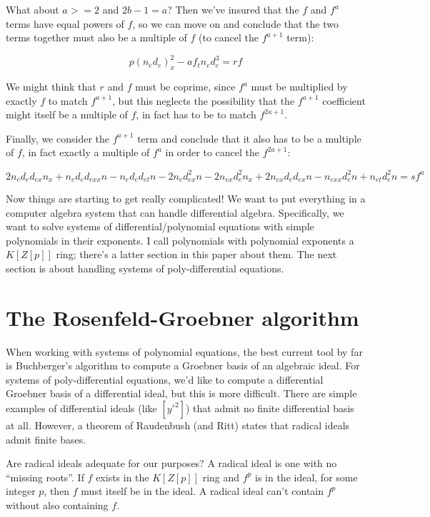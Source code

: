 \documentclass{article}
\begin{document}
What about $a>=2$ and $2b-1=a$?  Then we've insured that the
$f$ and $f^a$ terms have equal powers of $f$, so we can
move on and conclude that the two terms together must also
be a multiple of $f$ (to cancel the $f^{a+1}$ term):

$$p(n_e d_e)_x^2 - af_tn_ed_e^{3} = rf$$

We might think that $r$ and $f$ must be coprime, since $f^a$ must be
multiplied by exactly $f$ to match $f^{a+1}$, but this neglects the
possibility that the $f^{a+1}$ coefficient might itself be a multiple
of $f$, in fact has to be to match $f^{2a+1}$.

Finally, we consider the $f^{a+1}$ term and conclude that it also has
to be a multiple of $f$, in fact exactly a multiple of $f^a$ in order
to cancel the $f^{2a+1}$:

$$2n_ed_ed_{ex}n_x +n_ed_ed_{exx}n -n_ed_ed_{et}n -2n_ed_{ex}^{2}n -2n_{ex}d_e^{2}n_x +2n_{ex}d_ed_{ex}n -n_{exx}d_e^{2}n +n_{et}d_e^{2}n = s f^a$$


Now things are starting to get really complicated!  We want to put
everything in a computer algebra system that can handle differential
algebra.  Specifically, we want to solve systems of
differential/polynomial equations with simple polynomials in their
exponents.  I call polynomials with polynomial exponents a $K[Z[p]]$
ring; there's a latter section in this paper about them.  The next
section is about handling systems of poly-differential equations.


\vfill\eject
\section*{The Rosenfeld-Groebner algorithm}

When working with systems of polynomial equations, the best current
tool by far is Buchberger's algorithm to compute a Groebner basis of
an algebraic ideal.  For systems of poly-differential equations, we'd
like to compute a differential Groebner basis of a differential ideal,
but this is more difficult.  There are simple examples of differential
ideals (like $[y'^2]$) that admit no finite differential basis at all.
However, a theorem of Raudenbush (and Ritt) states that radical ideals
admit finite bases.

Are radical ideals adequate for our purposes?  A radical ideal is one
with no ``missing roots''.  If $f$ exists in the $K[Z[p]]$ ring and
$f^p$ is in the ideal, for some integer $p$, then $f$ must itself be
in the ideal.  A radical ideal can't contain $f^p$ without also
containing $f$.
\end{document}
